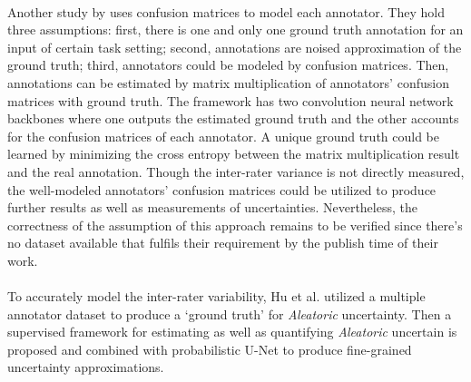 \documentclass[12pt]{extarticle}
\begin{document}
\paragraph{}
Another study by \cite{zhang2020disentangling} uses confusion matrices to model each annotator. They hold three assumptions: 
first, there is one and only one ground truth annotation for an input of certain task setting; 
second, annotations are noised approximation of the ground truth; third, annotators could be modeled by confusion matrices.
Then, annotations can be estimated by matrix multiplication of annotators' confusion matrices with ground truth. The framework has two convolution neural network backbones
where one outputs the estimated ground truth and the other accounts for the confusion matrices
of each annotator. 
A unique ground truth could be learned by minimizing the 
cross entropy between the matrix multiplication result and the real annotation.
Though the inter-rater variance is not directly measured, the well-modeled annotators'
confusion matrices could be utilized to produce further results
as well as measurements of uncertainties.
Nevertheless, the correctness of the assumption of this approach remains to be verified since there's no dataset available 
that fulfils their requirement by the publish time of their work.

\paragraph{}
To accurately model the inter-rater variability, Hu et al.\cite{hu2019supervised} utilized a multiple annotator dataset
to produce a `ground truth' for \textit{Aleatoric} uncertainty. Then a supervised framework for estimating
as well as quantifying \textit{Aleatoric} uncertain is proposed and combined with probabilistic U-Net
to produce fine-grained uncertainty approximations. 
\end{document}
